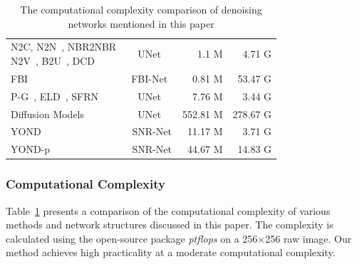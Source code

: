 \documentclass[lettersize,journal]{IEEEtran}
\begin{document}
	\begin{table}[t]
		\footnotesize
		\setlength\tabcolsep{4pt}
		\caption{The computational complexity comparison of denoising networks mentioned in this paper}\label{tab:cost}
		\centering
			\begin{tabular}{lcrr}
				\toprule
				\makebox[0.240\linewidth][l]{Method} & \makebox[0.130\linewidth][c]{Structure} & \makebox[0.110\linewidth][c]{Parameters} & \makebox[0.090\linewidth][c]{Macs} \\
				\midrule
				\rowcolor{lightgray}
				\makecell[l]{N2C, N2N~\cite{ICML18/N2N}, NBR2NBR~\cite{CVPR21/NBR2NBR}\\N2V~\cite{CVPR19/N2V}, B2U~\cite{CVPR22/B2U}, DCD~\cite{ICCV23/DCD}} & UNet~\cite{Unet} & 1.1 M & 4.71 G \\
				FBI~\cite{CVPR21/FBI} & FBI-Net~\cite{CVPR21/FBI} & 0.81 M & 53.47 G \\
				\rowcolor{lightgray}
				P-G~\cite{P-G}, ELD~\cite{TPAMI21/ELD}, SFRN~\cite{ICCV21/SFRN} & UNet~\cite{Unet} & 7.76 M & 3.44 G \\
				Diffusion Models~\cite{NIPS20/DDPM, ICLR21/DDIM,DMID} & UNet~\cite{Unet} & 552.81 M & 278.67 G \\
				\midrule
				\rowcolor{lightgray}
				YOND & SNR-Net & 11.17 M & 3.71 G \\
				YOND-p & SNR-Net & 44.67 M & 14.83 G \\
				\bottomrule
			\end{tabular}%
	\end{table}
	
	\subsubsection{\textbf{Computational Complexity}}
	
	Table~\ref{tab:cost} presents a comparison of the computational complexity of various methods and network structures discussed in this paper. The complexity is calculated using the open-source package \textit{ptflops} on a 256$\times$256 raw image. Our method achieves high practicality at a moderate computational complexity.
	
\end{document}
